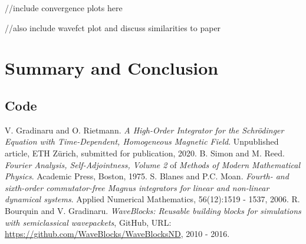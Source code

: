 \documentclass{article}
\begin{document}
//include convergence plots here

//also include wavefct plot and discuss similarities to paper

\section{Summary and Conclusion}

\begin{appendices}


\section{Code} \label{appendix:code}

\lstset{style=mystyle}





\end{appendices}


\begin{thebibliography}{9}
  V. Gradinaru and O. Rietmann.
  \emph{A High-Order Integrator for the
          Schr{\"o}dinger Equation with Time-Dependent,
          Homogeneous Magnetic Field}.
  Unpublished article, ETH Z{\"u}rich, submitted for publication, 2020.
  B. Simon and M. Reed.
  \emph{Fourier Analysis, Self-Adjointness, Volume 2} of \emph{Methods of Modern Mathematical Physics}.
  Academic Press, Boston, 1975.
  S. Blanes and P.C. Moan.
  \emph{Fourth- and sixth-order commutator-free Magnus integrators for linear and non-linear dynamical systems}.
  Applied Numerical Mathematics, 56(12):1519 - 1537, 2006.
  R. Bourquin and V. Gradinaru.
  \emph{{WaveBlocks}: Reusable building blocks for simulations with semiclassical wavepackets},
  GitHub, URL: \url{https://github.com/WaveBlocks/WaveBlocksND},
  2010 - 2016.

\end{thebibliography}
\end{document}
